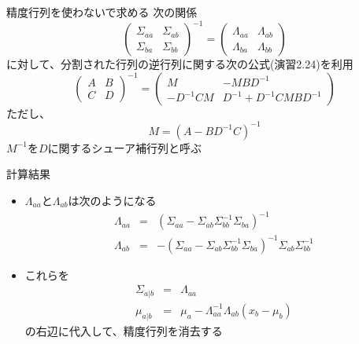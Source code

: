\begin{frame}{精度行列を使わないで求める}
 次の関係
 \begin{equation}
  \begin{pmatrix}
   \Sigma_{aa} & \Sigma_{ab}  \\
   \Sigma_{ba} & \Sigma_{bb}
  \end{pmatrix}^{-1}=
  \begin{pmatrix}
   \Lambda_{aa} & \Lambda_{ab}  \\
   \Lambda_{ba} & \Lambda_{bb}
  \end{pmatrix}
 \end{equation}
 に対して、分割された行列の逆行列に関する次の公式(演習2.24)を利用
 \begin{equation}
  \begin{pmatrix}
   A & B \\
   C & D
  \end{pmatrix}^{-1}
  =
  \begin{pmatrix}
   M & -MBD^{-1} \\
   -D^{-1}CM & D^{-1}+D^{-1}CMBD^{-1}
  \end{pmatrix}\label{053319_21Nov14}
 \end{equation}
 ただし、
 \begin{equation}
  M=(A-BD^{-1}C)^{-1}
 \end{equation}
 $M^{-1}$を$D$に関するシューア補行列と呼ぶ
\end{frame}

\begin{frame}{計算結果}
 \begin{itemize}
  \item $\Lambda_{aa}$と$\Lambda_{ab}$は次のようになる
        \begin{eqnarray}
         \Lambda_{aa}&=&(\Sigma_{aa}-\Sigma_{ab}\Sigma_{bb}^{-1}\Sigma_{ba})^{-1} \\
         \Lambda_{ab}&= &-(\Sigma_{aa}-\Sigma_{ab}\Sigma_{bb}^{-1}\Sigma_{ba})^{-1} \Sigma_{ab}\Sigma_{bb}^{-1}
        \end{eqnarray}
  \item これらを
        \begin{eqnarray}
         \Sigma_{a|b} &=& \Lambda_{aa} \\
         \mu_{a|b}  &= & \mu_a - \Lambda_{aa}^{-1}\Lambda_{ab}(x_b-\mu_b)
        \end{eqnarray}
        の右辺に代入して、精度行列を消去する
 \end{itemize}
\end{frame}

